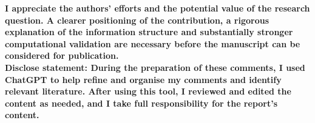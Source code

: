 \documentclass[11pt]{article}
\begin{document}
\noindent \textbf{I appreciate the authors’ efforts and the potential value of the research question. A clearer
positioning of the contribution, a rigorous explanation of the information structure and
substantially stronger computational validation are necessary before the manuscript can
be considered for publication.\\
Disclose statement: During the preparation of these comments, I used ChatGPT to help
refine and organise my comments and identify relevant literature. After using this tool, I
reviewed and edited the content as needed, and I take full responsibility for the report’s
content.}

%










 		
\end{document}
